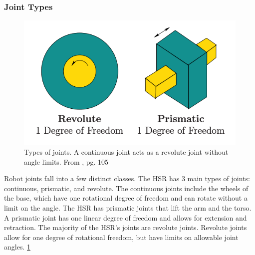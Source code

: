 \documentclass[12pt]{article}
\begin{document}
        \subsubsection{Joint Types}
            \begin{figure}[ht]
                \includegraphics[width=\linewidth]{screenshots/LaValle_joints}
                \centering
                \caption{Types of joints. A continuous joint acts as a revolute joint without angle limits. From \cite{lavalle_planning_2006}, pg. 105}
                \label{fig:joints_image}
            \end{figure}
            Robot joints fall into a few distinct classes. The HSR has 3 main types of joints: continuous, prismatic, and revolute. The continuous joints include the wheels of the base, which have one rotational degree of freedom and can rotate without a limit on the angle. The HSR has prismatic joints that lift the arm and the torso. A prismatic joint has one linear degree of freedom and allows for extension and retraction. The majority of the HSR's joints are revolute joints. Revolute joints allow for one degree of rotational freedom, but have limits on allowable joint angles.\cite{lavalle_planning_2006} \cref{fig:joints_image}
\end{document}
